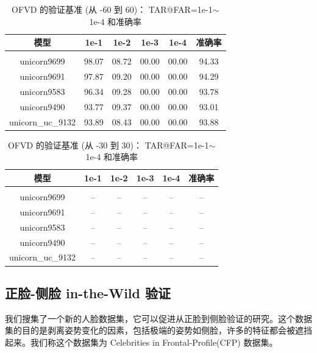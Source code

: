 \documentclass[a4paper, 11pt, UTF8]{ctexart}%
\begin{document}
\begin{table}[!htbp]
\caption{OFVD 的验证基准 (从 -60 到 60)： TAR@FAR=1e-1$\sim$ 1e-4 和准确率}
\label{table:OFVD60}
\begin{center}
\begin{tabular}{cccccc}
\multicolumn{1}{c}{\bf 模型}  &\multicolumn{1}{c}{\bf 1e-1} &\multicolumn{1}{c}{\bf 1e-2} &\multicolumn{1}{c}{\bf 1e-3} &\multicolumn{1}{c}{\bf 1e-4}&\multicolumn{1}{c}{\bf 准确率}
\\ \hline \\
unicorn9699 &  98.07 & 08.72 & 00.00 & 00.00 & 94.33 \\
unicorn9691 &  97.87 & 09.20 & 00.00 & 00.00 & 94.29 \\
unicorn9583 &  96.34 & 09.28 & 00.00 & 00.00 & 93.78 \\
unicorn9490 &  93.77 & 09.37 & 00.00 & 00.00 & 93.01 \\
unicorn\_uc\_9132 &  93.89 & 08.43 & 00.00 & 00.00 & 93.88 \\
\end{tabular}
\end{center}
\end{table}

\begin{table}[!htbp]
\caption{OFVD 的验证基准 (从 -30 到 30)： TAR@FAR=1e-1$\sim$ 1e-4 和准确率}
\label{table:OFVD30}
\begin{center}
\begin{tabular}{cccccc}
\multicolumn{1}{c}{\bf 模型}  &\multicolumn{1}{c}{\bf 1e-1} &\multicolumn{1}{c}{\bf 1e-2} &\multicolumn{1}{c}{\bf 1e-3} &\multicolumn{1}{c}{\bf 1e-4}&\multicolumn{1}{c}{\bf 准确率}
\\ \hline \\
unicorn9699 &  -- & -- & -- & -- & -- \\
unicorn9691 &  -- & -- & -- & -- & -- \\
unicorn9583 &  -- & -- & -- & -- & -- \\
unicorn9490 &  -- & -- & -- & -- & -- \\
unicorn\_uc\_9132 &  -- & -- & -- & -- & -- \\
\end{tabular}
\end{center}
\end{table}
\subsection{正脸-侧脸 in-the-Wild 验证}
我们搜集了一个新的人脸数据集，它可以促进从正脸到侧脸验证的研究。这个数据集的目的是剥离姿势变化的因素，包括极端的姿势如侧脸，许多的特征都会被遮挡起来。我们称这个数据集为 Celebrities in Frontal-Profile(CFP) 数据集。
\end{document}
